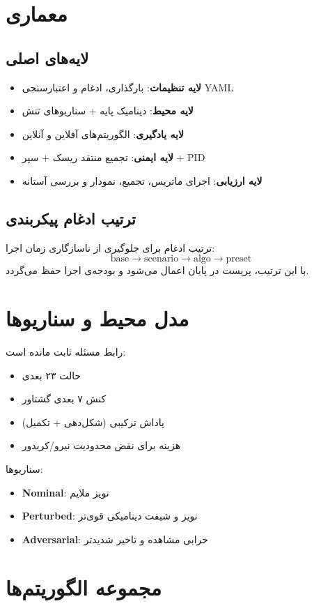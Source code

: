 \documentclass[conference]{IEEEtran}
\begin{document}
\section{معماری}
\subsection{لایه‌های اصلی}
\begin{itemize}
  \item \textbf{لایه تنظیمات}: بارگذاری، ادغام و اعتبارسنجی YAML
  \item \textbf{لایه محیط}: دینامیک پایه + سناریوهای تنش
  \item \textbf{لایه یادگیری}: الگوریتم‌های آفلاین و آنلاین
  \item \textbf{لایه ایمنی}: تجمیع منتقد ریسک + سپر + PID
  \item \textbf{لایه ارزیابی}: اجرای ماتریس، تجمیع، نمودار و بررسی آستانه
\end{itemize}

\subsection{ترتیب ادغام پیکربندی}
ترتیب ادغام برای جلوگیری از ناسازگاری زمان اجرا:
\[
\text{base} \rightarrow \text{scenario} \rightarrow \text{algo} \rightarrow \text{preset}
\]
با این ترتیب، پریست  در پایان اعمال می‌شود و بودجه‌ی اجرا حفظ می‌گردد.

\section{مدل محیط و سناریوها}
رابط مسئله ثابت مانده است:
\begin{itemize}
  \item حالت ۲۳ بعدی
  \item کنش ۷ بعدی گشتاور
  \item پاداش ترکیبی (شکل‌دهی + تکمیل)
  \item هزینه برای نقض محدودیت نیرو/کریدور
\end{itemize}

سناریوها:
\begin{itemize}
  \item \textbf{Nominal}: نویز ملایم
  \item \textbf{Perturbed}: نویز و شیفت دینامیکی قوی‌تر
  \item \textbf{Adversarial}: خرابی مشاهده و تاخیر شدیدتر
\end{itemize}

\section{مجموعه الگوریتم‌ها}
\end{document}

